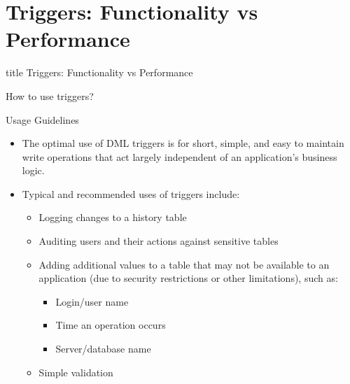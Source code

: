 \documentclass[aspectratio=169, xcolor=dvipsnames]{beamer}
\begin{document}
\section{Triggers: Functionality vs Performance}

\begin{frame}
  \vfill
  \centering
  \begin{beamercolorbox}[sep=8pt,center,shadow=true,rounded=true]{title}
    Triggers: Functionality vs Performance\par%
  \end{beamercolorbox}
  \vfill
\end{frame}

\begin{frame}{How to use triggers?}
    \begin{block}{Usage Guidelines}
        \begin{itemize}[<+->]
            \item The optimal use of DML triggers is for short, simple, and easy to maintain write operations that act largely independent of an application's business logic.
            \item Typical and recommended uses of triggers include:
            \begin{itemize}
                \item[$\triangleright$] Logging changes to a history table
                \item[$\triangleright$] Auditing users and their actions against sensitive tables
                \item[$\triangleright$] Adding additional values to a table that may not be available to an application (due to security restrictions or other limitations), such as:
                \begin{itemize}
                    \item Login/user name
                    \item Time an operation occurs
                    \item Server/database name
                \end{itemize}
                \item[$\triangleright$] Simple validation
            \end{itemize}
        \end{itemize}
    \end{block}
    \vspace{1em}
\end{frame}
\end{document}
